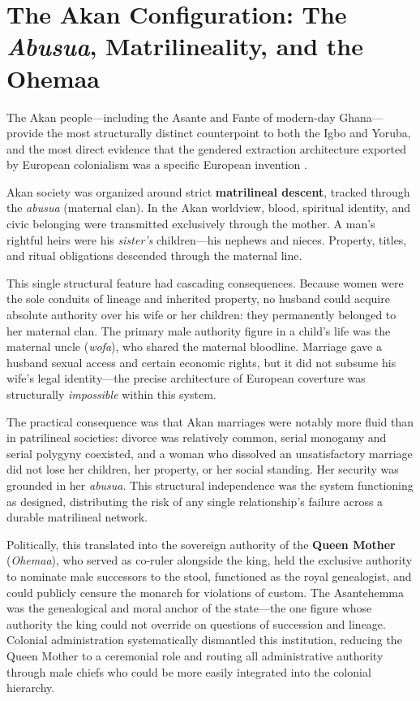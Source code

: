 \section{The Akan Configuration: The \textit{Abusua}, Matrilineality, and the Ohemaa}
\label{sec:akan}

The Akan people---including the Asante and Fante of modern-day Ghana---provide the most structurally distinct counterpoint to both the Igbo and Yoruba, and the most direct evidence that the gendered extraction architecture exported by European colonialism was a specific European invention \cite{akan_wikipedia, akan_nkenne, akan_matriarchy}.

Akan society was organized around strict \textbf{matrilineal descent}, tracked through the \textit{abusua} (maternal clan). In the Akan worldview, blood, spiritual identity, and civic belonging were transmitted exclusively through the mother. A man's rightful heirs were his \textit{sister's} children---his nephews and nieces. Property, titles, and ritual obligations descended through the maternal line.

This single structural feature had cascading consequences. Because women were the sole conduits of lineage and inherited property, no husband could acquire absolute authority over his wife or her children: they permanently belonged to her maternal clan. The primary male authority figure in a child's life was the maternal uncle (\textit{wofa}), who shared the maternal bloodline. Marriage gave a husband sexual access and certain economic rights, but it did not subsume his wife's legal identity---the precise architecture of European coverture was structurally \textit{impossible} within this system.

The practical consequence was that Akan marriages were notably more fluid than in patrilineal societies: divorce was relatively common, serial monogamy and serial polygyny coexisted, and a woman who dissolved an unsatisfactory marriage did not lose her children, her property, or her social standing. Her security was grounded in her \textit{abusua}. This structural independence was the system functioning as designed, distributing the risk of any single relationship's failure across a durable matrilineal network.

Politically, this translated into the sovereign authority of the \textbf{Queen Mother} (\textit{Ohemaa}), who served as co-ruler alongside the king, held the exclusive authority to nominate male successors to the stool, functioned as the royal genealogist, and could publicly censure the monarch for violations of custom. The Asantehemma was the genealogical and moral anchor of the state---the one figure whose authority the king could not override on questions of succession and lineage. Colonial administration systematically dismantled this institution, reducing the Queen Mother to a ceremonial role and routing all administrative authority through male chiefs who could be more easily integrated into the colonial hierarchy.

